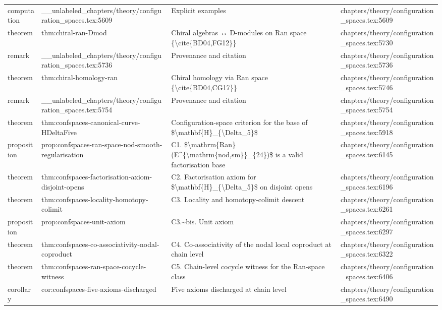 \documentclass[11pt]{article}
\begin{document}
\begin{longtable}{L{0.10\textwidth}L{0.26\textwidth}L{0.42\textwidth}L{0.22\textwidth}}
computation & \_\_unlabeled\_chapters/theory/configuration\_spaces.tex:5609 & Explicit examples & chapters/theory/configuration\_spaces.tex:5609\\
theorem & thm:chiral-ran-Dmod & Chiral algebras ↔ D-modules on Ran space \{\textbackslash{}cite\{BD04,FG12\}\} & chapters/theory/configuration\_spaces.tex:5730\\
remark & \_\_unlabeled\_chapters/theory/configuration\_spaces.tex:5736 & Provenance and citation & chapters/theory/configuration\_spaces.tex:5736\\
theorem & thm:chiral-homology-ran & Chiral homology via Ran space \{\textbackslash{}cite\{BD04,CG17\}\} & chapters/theory/configuration\_spaces.tex:5746\\
remark & \_\_unlabeled\_chapters/theory/configuration\_spaces.tex:5754 & Provenance and citation & chapters/theory/configuration\_spaces.tex:5754\\
theorem & thm:confspaces-canonical-curve-HDeltaFive & Configuration-space criterion for the base of \$\textbackslash{}mathbf\{H\}\_\{\textbackslash{}Delta\_5\}\$ & chapters/theory/configuration\_spaces.tex:5918\\
proposition & prop:confspaces-ran-space-nod-smooth-regularisation & C1. \$\textbackslash{}mathrm\{Ran\}(E\textasciicircum{}\{\textbackslash{}mathrm\{nod,sm\}\}\_\{24\})\$ is a valid factorisation base & chapters/theory/configuration\_spaces.tex:6145\\
theorem & thm:confspaces-factorisation-axiom-disjoint-op{}ens & C2. Factorisation axiom for \$\textbackslash{}mathbf\{H\}\_\{\textbackslash{}Delta\_5\}\$ on disjoint op{}ens & chapters/theory/configuration\_spaces.tex:6196\\
theorem & thm:confspaces-locality-homotopy-colimit & C3. Locality and homotopy-colimit descent & chapters/theory/configuration\_spaces.tex:6261\\
proposition & prop:confspaces-unit-axiom & C3.\textasciitilde{}bis. Unit axiom & chapters/theory/configuration\_spaces.tex:6297\\
theorem & thm:confspaces-co-associativity-nodal-coproduct & C4. Co-associativity of the nodal local coproduct at chain level & chapters/theory/configuration\_spaces.tex:6322\\
theorem & thm:confspaces-ran-space-cocycle-witness & C5. Chain-level cocycle witness for the Ran-space class & chapters/theory/configuration\_spaces.tex:6406\\
corollary & cor:confspaces-five-axioms-discharged & Five axioms discharged at chain level & chapters/theory/configuration\_spaces.tex:6490\\

\end{longtable}
\end{document}
